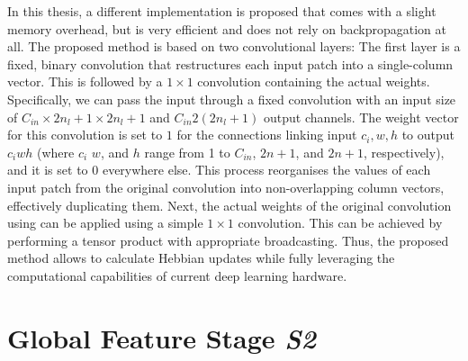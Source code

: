 In this thesis, a different implementation is proposed that comes with a slight memory overhead, but is very efficient and does not rely on backpropagation at all. The proposed method is based on two convolutional layers: The first layer is a fixed, binary convolution that restructures each input patch into a single-column vector. This is followed by a $1\times1$ convolution containing the actual weights. Specifically, we can pass the input through a fixed convolution with an input size of $C_{in} \times 2n_l+1 \times 2n_l+1$ and $C_{in} 2(2n_l+1)$ output channels. The weight vector for this convolution is set to $1$ for the connections linking input $c_i,w,h$ to output $c_iwh$ (where $c_i$ $w$, and $h$ range from 1 to $C_{in}$, $2n+1$, and $2n+1$, respectively), and it is set to 0 everywhere else. This process reorganises the values of each input patch from the original convolution into non-overlapping column vectors, effectively duplicating them. Next, the actual weights of the original convolution using can be applied using a simple $1\times1$ convolution. This can be achieved by performing a tensor product with appropriate broadcasting.
Thus, the proposed method allows to calculate Hebbian updates while fully leveraging the computational capabilities of current deep learning hardware.








\section{Global Feature Stage \emph{S2}}







